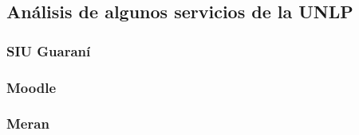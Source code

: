 \subsection{Análisis de algunos servicios de la UNLP}
\label{analisis_servicios_unlp}

\subsubsection{SIU Guaraní}
\label{guarani}

\subsubsection{Moodle}
\label{moodle}

\subsubsection{Meran}
\label{merans}